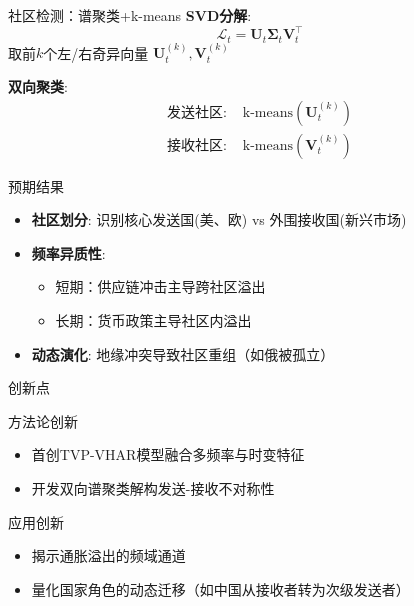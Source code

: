 \documentclass{beamer}
\begin{document}
\begin{frame}{社区检测：谱聚类+k-means}
\textbf{SVD分解}:
\begin{equation*}
\mathcal{L}_t = \boldsymbol{U}_t \boldsymbol{\Sigma}_t \boldsymbol{V}_t^\top
\end{equation*}
取前$k$个左/右奇异向量 $\boldsymbol{U}_t^{(k)}, \boldsymbol{V}_t^{(k)}$

\textbf{双向聚类}:
\begin{align*}
\text{发送社区: } & \text{k-means}(\boldsymbol{U}_t^{(k)}) \\
\text{接收社区: } & \text{k-means}(\boldsymbol{V}_t^{(k)})
\end{align*}
\end{frame}

\begin{frame}{预期结果}

\begin{itemize}
\item \textbf{社区划分}: 识别核心发送国(美、欧) vs 外围接收国(新兴市场)
\item \textbf{频率异质性}: 
  \begin{itemize}
  \item 短期：供应链冲击主导跨社区溢出
  \item 长期：货币政策主导社区内溢出
  \end{itemize}
\item \textbf{动态演化}: 地缘冲突导致社区重组（如俄被孤立）
\end{itemize}


\end{frame}

\begin{frame}{创新点}
\begin{block}{方法论创新}
\begin{itemize}
\item 首创TVP-VHAR模型融合多频率与时变特征
\item 开发双向谱聚类解构发送-接收不对称性
\end{itemize}
\end{block}

\begin{block}{应用创新}
\begin{itemize}
\item 揭示通胀溢出的频域通道
\item 量化国家角色的动态迁移（如中国从接收者转为次级发送者）
\end{itemize}
\end{block}
\end{frame}
\end{document}
